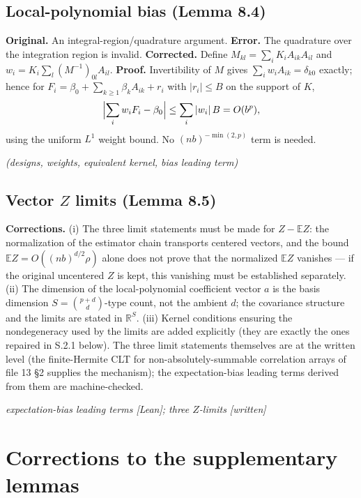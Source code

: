 \documentclass[11pt]{article}
\theoremstyle{definition}
\theoremstyle{remark}
\newcommand{\statustag}[1]{%
  \par\nobreak\begingroup\footnotesize\itshape\raggedleft #1\par\endgroup}
\newcommand{\Wlean}{[Lean]}
\newcommand{\Wwritten}{[written]}
\begin{document}
\subsection{Local-polynomial bias (Lemma 8.4)}\label{sec:84}

\noindent\textbf{Original.} An integral-region/quadrature argument.
\textbf{Error.} The quadrature over the integration region is invalid.
\textbf{Corrected.} Define $M_{kl}=\sum_i K_i A_{ik}A_{il}$ and
$w_i = K_i\sum_l (M^{-1})_{0l}A_{il}$.
\textbf{Proof.} Invertibility of $M$ gives
$\sum_i w_i A_{ik}=\delta_{k0}$ exactly; hence for
$F_i=\beta_0+\sum_{k\ge1}\beta_k A_{ik}+r_i$ with $|r_i|\le B$ on the support
of $K$,
\[
\Bigl|\sum_i w_iF_i-\beta_0\Bigr|\le \sum_i|w_i|\,B = O(b^p),
\]
using the uniform $L^1$ weight bound. No $(nb)^{-\min(2,p)}$ term is needed.
\statustag{\Wlean (designs, weights, equivalent kernel, bias leading term)}

\smallskip{}

\subsection{Vector $Z$ limits (Lemma 8.5)}
\textbf{Corrections.} (i) The three limit statements must be made for
$Z-\mathbb EZ$: the normalization of the estimator chain transports centered
vectors, and the bound $\mathbb EZ=O((nb)^{d/2}\rho)$ alone does not prove
that the normalized $\mathbb EZ$ vanishes --- if the original uncentered $Z$
is kept, this vanishing must be established separately.
(ii) The dimension of the local-polynomial coefficient vector $a$ is the
basis dimension $S=\binom{p+d}{d}$-type count, not the ambient $d$; the
covariance structure and the limits are stated in $\mathbb R^{S}$.
(iii) Kernel conditions ensuring the nondegeneracy used by the limits are
added explicitly (they are exactly the ones repaired in S.2.1 below).
The three limit statements themselves are at the written level (the
finite-Hermite CLT for non-absolutely-summable correlation arrays of file 13
\S2 supplies the mechanism); the expectation-bias leading terms derived from
them are machine-checked.
\statustag{expectation-bias leading terms \Wlean; three $Z$-limits \Wwritten}

\smallskip{}

\section{Corrections to the supplementary lemmas}\label{sec:supp-corr}
\end{document}
